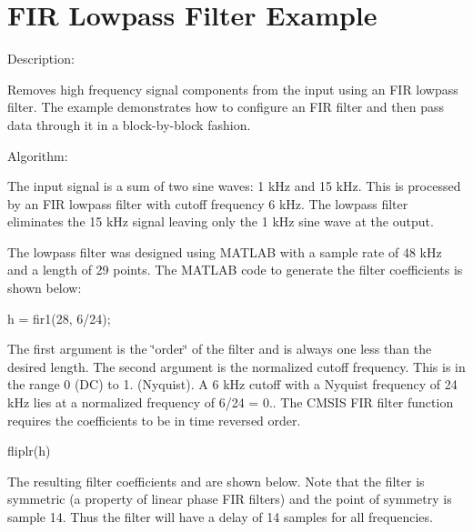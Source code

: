 \hypertarget{group___f_i_r_l_p_f}{\section{F\-I\-R Lowpass Filter Example}
\label{group___f_i_r_l_p_f}
}
\begin{DoxyParagraph}{Description\-: }

\end{DoxyParagraph}
\begin{DoxyParagraph}{}
Removes high frequency signal components from the input using an F\-I\-R lowpass filter. The example demonstrates how to configure an F\-I\-R filter and then pass data through it in a block-\/by-\/block fashion. 
\end{DoxyParagraph}
\begin{DoxyParagraph}{Algorithm\-:}

\end{DoxyParagraph}
\begin{DoxyParagraph}{}
The input signal is a sum of two sine waves\-: 1 k\-Hz and 15 k\-Hz. This is processed by an F\-I\-R lowpass filter with cutoff frequency 6 k\-Hz. The lowpass filter eliminates the 15 k\-Hz signal leaving only the 1 k\-Hz sine wave at the output. 
\end{DoxyParagraph}
\begin{DoxyParagraph}{}
The lowpass filter was designed using M\-A\-T\-L\-A\-B with a sample rate of 48 k\-Hz and a length of 29 points. The M\-A\-T\-L\-A\-B code to generate the filter coefficients is shown below\-: 
\begin{DoxyPre}
    h = fir1(28, 6/24);
\end{DoxyPre}
 The first argument is the \char`\"{}order\char`\"{} of the filter and is always one less than the desired length. The second argument is the normalized cutoff frequency. This is in the range 0 (D\-C) to 1. (Nyquist). A 6 k\-Hz cutoff with a Nyquist frequency of 24 k\-Hz lies at a normalized frequency of 6/24 = 0.. The C\-M\-S\-I\-S F\-I\-R filter function requires the coefficients to be in time reversed order. 
\begin{DoxyPre}
    fliplr(h)
\end{DoxyPre}
 The resulting filter coefficients and are shown below. Note that the filter is symmetric (a property of linear phase F\-I\-R filters) and the point of symmetry is sample 14. Thus the filter will have a delay of 14 samples for all frequencies. 
\end{DoxyParagraph}
